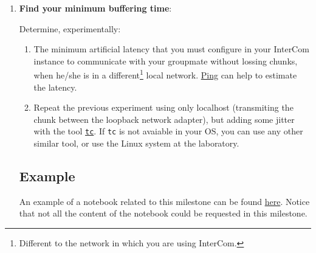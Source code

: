\begin{enumerate}

\item \textbf{Find your minimum buffering time}:

  Determine, experimentally:
  \begin{enumerate}
  \item The minimum artificial latency that you must configure in your
    InterCom instance to communicate with your groupmate without lossing
    chunks, when he/she is in a different\footnote{Different to the
      network in which you are using InterCom.} local
    network. \href{https://vicente-gonzalez-ruiz.github.io/about_ping/}{Ping}
    can help to estimate the latency.
  \item Repeat the previous experiment using only localhost (transmiting
    the chunk between the loopback network adapter), but adding some
    jitter with the tool
    \href{https://vicente-gonzalez-ruiz.github.io/about_tc/}{\texttt{tc}}. If
    \texttt{tc} is not avaiable in your OS, you can use any other
    similar tool, or use the Linux system at the laboratory.
  \end{enumerate}
  
  \subsection*{Example}
  An example of a notebook related to this milestone can be found
  \href{https://github.com/Tecnologias-multimedia/InterCom/blob/master/docs/Hidding_the_Network_Jitter__example.ipynb}{here}. Notice
  that not all the content of the notebook could be requested in this
  milestone.
  

\end{enumerate}

